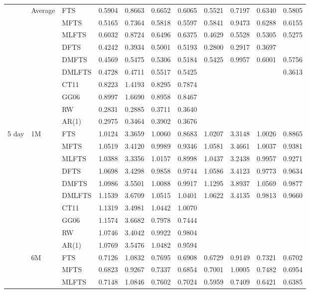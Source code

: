 \documentclass[12pt,a4paper]{article}
\def\textBF#1{\sbox\CBox{#1}\resizebox{\wd\CBox}{\ht\CBox}{\textbf{#1}}}
\begin{document}
\begin{center}
\begin{small}
\begin{longtable}{@{}lllcccccccc@{}}
  \cmidrule{2-11} 
  & Average & FTS &  0.5904 & 0.8663 & 0.6652 & 0.6065 & 0.5521 & 0.7197 & 0.6340 & 0.5805 \\
  & & MFTS & 0.5165 & 0.7364 & 0.5818 & 0.5597 & 0.5841 & 0.9473 & 0.6288 & 0.6155 \\
  & & MLFTS & 0.6032 & 0.8724 & 0.6496 & 0.6375 & 0.4629 & 0.5528 & 0.5305 & 0.5275 \\
  & & DFTS & 0.4242 & 0.3934 & 0.5001 & 0.5193  & 0.2800 & 0.2917 & 0.3697 & \textBF{0.3609} \\
  & & DMFTS & 0.4569 & 0.5475 & 0.5306 & 0.5184 & 0.5425 & 0.9957 & 0.6001 & 0.5756 \\
  & & DMLFTS & 0.4728 & 0.4711 & 0.5517 & 0.5425 & \textBF{0.2793} & \textBF{0.2869} & \textBF{0.3692} & 0.3613 \\
& & CT11 & 0.8223 & 1.4193 & 0.8295 & 0.7874 \\
&& GG06 & 0.8997 & 1.6690 & 0.8958 & 0.8467 \\
& & RW & 0.2831 & 0.2885 & 0.3711 & 0.3640 \\
& & AR(1) & 0.2975 & 0.3464 & 0.3902 & 0.3676 \\
\midrule
5 day & 1M & FTS & 1.0124 & 3.3659 & 1.0060 & 0.8683 & 1.0207 & 3.3148 & 1.0026 & 0.8865 \\ 
& & MFTS & 1.0519 & 3.4120 & 0.9989 & 0.9346 & 1.0581 & 3.4661 & 1.0037 & 0.9381 \\ 
& & MLFTS & 1.0388 & 3.3356 & 1.0157 & 0.8998 & 1.0437 & 3.2438 & 0.9957 & 0.9271 \\
& & DFTS & 1.0698 & 3.4298 & 0.9858 & 0.9744 & 1.0586 & 3.4123 & 0.9773 & 0.9634 \\ 
& & DMFTS & 1.0986 & 3.5501 & 1.0088 & 0.9917 & 1.1295 & 3.8937 & 1.0569 & 0.9877 \\ 
& & DMLFTS & 1.1539 & 3.6709 & 1.0515 & 1.0401 & 1.0622 & 3.4135 & 0.9813 & 0.9660 \\
& & CT11 & 1.1319 & 3.4981 & 1.0442 & 1.0070 \\
& & GG06 & 1.1574 & 3.6682 & 0.7978 & 0.7444 \\
& & RW & 1.0746 & 3.4042 & 0.9922 & 0.9804 \\
& & AR(1) & 1.0769 & 3.5476 & 1.0482 & 0.9594 \\
 \cmidrule{2-11}
   & 6M & FTS & 0.7126 & 1.0832 & 0.7695 & 0.6908 & 0.6729 & 0.9149 & 0.7321 & 0.6702 \\ 
& & MFTS & 0.6823 & 0.9267 & 0.7337 & 0.6854 & 0.7001 & 1.0005 & 0.7482 & 0.6954 \\ 
& & MLFTS & 0.7148 & 1.0846 & 0.7602 & 0.7024 & 0.5959 & 0.7409 & 0.6421 & 0.6385 \\

\end{longtable}
\end{small}
\end{center}
\end{document}
